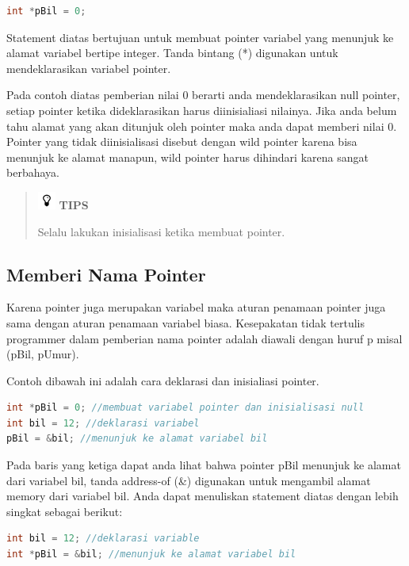 \begin{lstlisting}[language=c++, numbers=none]
int *pBil = 0;
\end{lstlisting}

Statement diatas bertujuan untuk membuat pointer variabel yang menunjuk
ke alamat variabel bertipe integer. Tanda bintang (*) digunakan untuk
mendeklarasikan variabel pointer.

Pada contoh diatas pemberian nilai 0 berarti anda mendeklarasikan null
pointer, setiap pointer ketika dideklarasikan harus diinisialiasi
nilainya. Jika anda belum tahu alamat yang akan ditunjuk oleh pointer
maka anda dapat memberi nilai 0. Pointer yang tidak diinisialisasi
disebut dengan wild pointer karena bisa menunjuk ke alamat manapun, wild
pointer harus dihindari karena sangat berbahaya.

\begin{quotation}
\includegraphics{../manuscript/images/tips.png} \textbf{TIPS} 
	 
	 Selalu lakukan inisialisasi ketika membuat pointer.
\end{quotation}


\subsection{Memberi Nama Pointer}\label{memberi-nama-pointer}

Karena pointer juga merupakan variabel maka aturan penamaan pointer juga
sama dengan aturan penamaan variabel biasa. Kesepakatan tidak tertulis
programmer dalam pemberian nama pointer adalah diawali dengan huruf p
misal (pBil, pUmur).

Contoh dibawah ini adalah cara deklarasi dan inisialiasi pointer.

\begin{lstlisting}[language=c++, numbers=none]
int *pBil = 0; //membuat variabel pointer dan inisialisasi null
int bil = 12; //deklarasi variabel
pBil = &bil; //menunjuk ke alamat variabel bil
\end{lstlisting}

Pada baris yang ketiga dapat anda lihat bahwa pointer pBil menunjuk ke
alamat dari variabel bil, tanda address-of (\&) digunakan untuk
mengambil alamat memory dari variabel bil. Anda dapat menuliskan
statement diatas dengan lebih singkat sebagai berikut:

\begin{lstlisting}[language=c++, numbers=none]
int bil = 12; //deklarasi variable
int *pBil = &bil; //menunjuk ke alamat variabel bil
\end{lstlisting}

